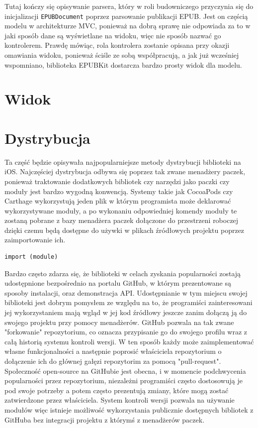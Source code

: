 Tutaj kończy się opisywanie parsera, który w roli budowniczego przyczynia się do inicjalizacji \texttt{EPUBDocument} poprzez parsowanie publikacji EPUB. Jest on częścią modelu w architekturze MVC, ponieważ na dobrą sprawę nie odpowiada za to w jaki sposób dane są wyświetlane na widoku, więc nie sposób nazwać go kontrolerem. Prawdę mówiąc, rola kontrolera zostanie opisana przy okazji omawiania widoku, ponieważ ściśle ze sobą współpracują, a jak już wcześniej wspomniano, biblioteka EPUBKit dostarcza bardzo prosty widok dla modelu.

\section{Widok}

\section{Dystrybucja}

Ta część będzie opisywała najpopularniejsze metody dystrybucji biblioteki na iOS. Najczęściej dystrybucja odbywa się poprzez tak zwane menadżery paczek, ponieważ traktowanie dodatkowych bibliotek czy narzędzi jako paczki czy moduły jest bardzo wygodną konwencją. Systemy takie jak CocoaPods czy Carthage wykorzystują jeden plik w którym programista może deklarować wykorzystywane moduły, a po wykonaniu odpowiedniej komendy moduły te zostaną pobrane z bazy menadżera paczek dołączone do przestrzeni roboczej dzięki czemu będą dostępne do używki w plikach źródłowych projektu poprzez zaimportowanie ich.

\begin{lstlisting}[language=swift-reference]
import (module)
\end{lstlisting}

Bardzo często zdarza się, że biblioteki w celach zyskania popularności zostają udostępnione bezpośrednio na portalu GitHub, w którym prezentowane są sposoby instalacji, oraz demonstracja API. Udostępnianie w tym miejscu swojej biblioteki jest dobrym pomysłem ze względu na to, że programiści zainteresowani jej wykorzystaniem mają wgląd w jej kod źródłowy jeszcze zanim dołączą ją do swojego projektu przy pomocy menadżerów. GitHub pozwala na tak zwane "forkowanie" repozytorium, co oznacza przypisanie go do swojego profilu wraz z całą historią systemu kontroli wersji. W ten sposób każdy może zaimplementować własne funkcjonalności a następnie poprosić właściciela repozytorium o dołączenie ich do głównej gałęzi repozytorim za pomocą "pull-request". Społeczność open-source na GitHubie jest obecna, i w momencie podchwycenia popularności przez repozytorium, niezależni programiści często dostosowują je pod swoje potrzeby a potem często prezentują zmiany, które mogą zostać zatwierdzone przez właściciela. System kontroli wersji pozwala na używanie modułów więc istnieje możliwość wykorzystania publicznie dostępnych bibliotek z GitHuba bez integracji projektu z którymś z menadżerów paczek.

